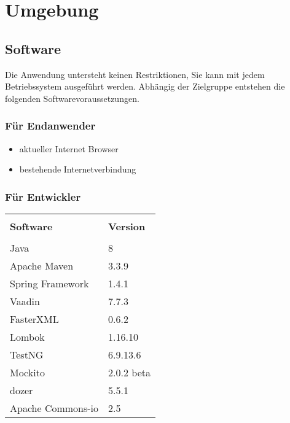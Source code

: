  
\section{Umgebung}
 
\subsection{Software}

Die Anwendung untersteht keinen Restriktionen, Sie kann mit jedem Betriebssystem ausgeführt werden.
Abhängig der Zielgruppe entstehen die folgenden Softwarevoraussetzungen.

\subsubsection {Für Endanwender}

\begin{itemize}
\item aktueller Internet Browser 
\item bestehende Internetverbindung
\end{itemize}

\subsubsection	{Für Entwickler}

\begin{table}[H]
\begin{center}
\begin{tabular}{|ll|}
\hline \hline \cellcolor{blue!25} & \cellcolor{blue!25}\\[-0.4cm]
\cellcolor{blue!25} \textbf{Software} &  \cellcolor{blue!25} \textbf{Version} \\ 
\hline& \\[-0.4cm]
Java              & 8                \\[0.1cm]
Apache Maven      & 3.3.9            \\[0.1cm]
Spring Framework  & 1.4.1            \\[0.1cm] 
Vaadin            & 7.7.3            \\[0.1cm]
FasterXML         & 0.6.2            \\[0.1cm]
Lombok            & 1.16.10          \\[0.1cm]
TestNG            & 6.9.13.6         \\[0.1cm]
Mockito           & 2.0.2 beta       \\[0.1cm]
dozer             & 5.5.1            \\[0.1cm]
Apache Commons-io & 2.5 \\
\hline \hline             
\end{tabular}
\end{center}
\end{table}
 
